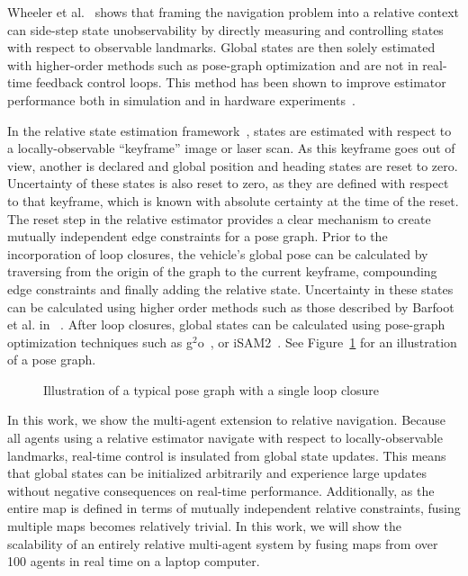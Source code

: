 Wheeler et al.~\cite{Wheeler2017a} shows that framing the navigation problem into a relative context can side-step state unobservability by directly measuring and controlling states with respect to observable landmarks.  Global states are then solely estimated with higher-order methods such as pose-graph optimization and are not in real-time feedback control loops.  This method has been shown to improve estimator performance both in simulation and in hardware experiments~\cite{Wheeler2017a, Wheeler2017b}.

In the relative state estimation framework~\cite{Koch2017}, states are estimated with respect to a locally-observable ``keyframe'' image or laser scan.  As this keyframe goes out of view, another is declared and global position and heading states are reset to zero.  Uncertainty of these states is also reset to zero, as they are defined with respect to that keyframe, which is known with absolute certainty at the time of the reset.  The reset step in the relative estimator provides a clear mechanism to create mutually independent edge constraints for a pose graph.  Prior to the incorporation of loop closures, the vehicle's global pose can be calculated by traversing from the origin of the graph to the current keyframe, compounding edge constraints and finally adding the relative state.  Uncertainty in these states can be calculated using higher order methods such as those described by Barfoot et al. in ~\cite{Barfoot2014}.  After loop closures, global states can be calculated using pose-graph optimization techniques such as g$^2$o~\cite{Kummerle2011}, or iSAM2~\cite{Kaess2012}.  See Figure~\ref{fig:pose_graph} for an illustration of a pose graph.

\begin{figure}
  
  \caption{Illustration of a typical pose graph with a single loop closure}
  \label{fig:pose_graph}
\end{figure}

In this work, we show the multi-agent extension to relative navigation.  Because all agents using a relative estimator navigate with respect to locally-observable landmarks, real-time control is insulated from global state updates.  This means that global states can be initialized arbitrarily and experience large updates without negative consequences on real-time performance. Additionally, as the entire map is defined in terms of mutually independent relative constraints, fusing multiple maps becomes relatively trivial.  In this work, we will show the scalability of an entirely relative multi-agent system by fusing maps from over 100 agents in real time on a laptop computer.

